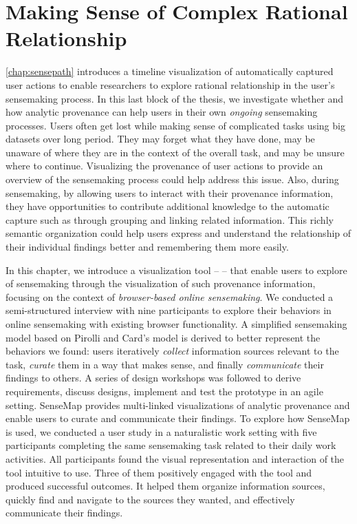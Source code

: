 \chapter{Making Sense of Complex Rational Relationship}
\label{chap:sensemap}

\graphicspath{{Chapter6/figures/}}



\autoref{chap:sensepath} introduces a timeline visualization of automatically captured user actions to enable researchers to explore rational relationship in the user's sensemaking process. In this last block of the thesis, we investigate whether and how analytic provenance can help users in their own \emph{ongoing} sensemaking processes. Users often get lost while making sense of complicated tasks using big datasets over long period. They may forget what they have done, may be unaware of where they are in the context of the overall task, and may be unsure where to continue. Visualizing the provenance of user actions to provide an overview of the sensemaking process could help address this issue. Also, during sensemaking, by allowing users to interact with their provenance information, they have opportunities to contribute additional knowledge to the automatic capture such as through grouping and linking related information. This richly semantic organization could help users express and understand the relationship of their individual findings better and remembering them more easily.

In this chapter, we introduce a visualization tool -- \emph{} -- that enable users to explore  of sensemaking through the visualization of such  provenance information, focusing on the context of \emph{browser-based online sensemaking}. We conducted a semi-structured interview with nine participants to explore their behaviors in online sensemaking with existing browser functionality. A simplified sensemaking model based on Pirolli and Card's model is derived to better represent the behaviors we found: users iteratively \emph{collect} information sources relevant to the task, \emph{curate} them in a way that makes sense, and finally \emph{communicate} their findings to others. A series of design workshops was followed to derive requirements, discuss designs, implement and test the prototype in an agile setting. SenseMap provides multi-linked visualizations of analytic provenance and enable users to curate and communicate their findings. To explore how SenseMap is used, we conducted a user study in a naturalistic work setting with five participants completing the same sensemaking task related to their daily work activities. All participants found the visual representation and interaction of the tool intuitive to use. Three of them positively engaged with the tool and produced successful outcomes. It helped them organize information sources, quickly find and navigate to the sources they wanted, and effectively communicate their findings. 





